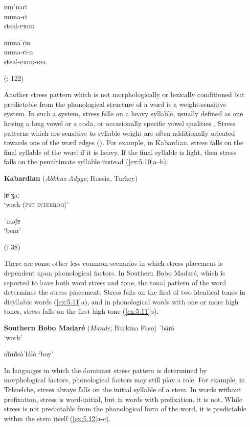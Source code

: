 \ex  muˈnaɾi\\
  muna-ɾi\\
steal-\textsc{prog}

\ex  munaˈɾin\\
  muna-ɾi-n\\
steal-\textsc{prog}-\textsc{rel}

(\citealt{VallejosYopán2010}: 122)
\z
\z

  Another stress pattern which is not morphologically or lexically conditioned but predictable from the phonological structure of a word is a weight-sensitive system. In such a system, stress falls on a heavy syllable, usually defined as one having a long vowel or a coda, or occasionally specific vowel qualities \citep{Gordon2006}. Stress patterns which are sensitive to syllable weight are often additionally oriented towards one of the word edges (\citealt{GoedemansvanderHulst2013b}). For example, in Kabardian, stress falls on the final syllable of the word if it is heavy. If the final syllable is light, then stress falls on the penultimate syllable instead (\ref{ex:5.10}a--b).

\ea\label{ex:5.10}
  \textbf{Kabardian} (\textit{Abkhaz-Adyge}; Russia, Turkey)

\ea   lɐˈʒaː\\
\glt ‘work (\textsc{pst} \textsc{interrog})’

\ex  ˈməʃɐ\\
\glt ‘bear’

(\citealt{GordonApplebaum2010}: 38)
\z
\z

  There are some other less common scenarios in which stress placement is dependent upon phonological factors. In Southern Bobo Madaré, which is reported to have both word stress and tone, the tonal pattern of the word determines the stress placement. Stress falls on the first of two identical tones in disyllabic words (\ref{ex:5.11}a), and in phonological words with one or more high tones, stress falls on the first high tone (\ref{ex:5.11}b).

\ea\label{ex:5.11}
  \textbf{Southern Bobo Madaré} (\textit{Mande}; Burkina Faso)
\ea  ˈbāɾā\\
\glt ‘work’

\ex  n\`{ĩ}m\`{ĩ}sàˈlálò
\glt ‘boy’
\citep[110]{Morse1976}
\z
\z

  In languages in which the dominant stress pattern is determined by morphological factors, phonological factors may still play a role. For example, in Tehuelche, stress always falls on the initial syllable of a stem. In words without prefixation, stress is word-initial, but in words with prefixation, it is not. While stress is not predictable from the phonological form of the word, it is predictable within the stem itself (\ref{ex:5.12}a-c).

